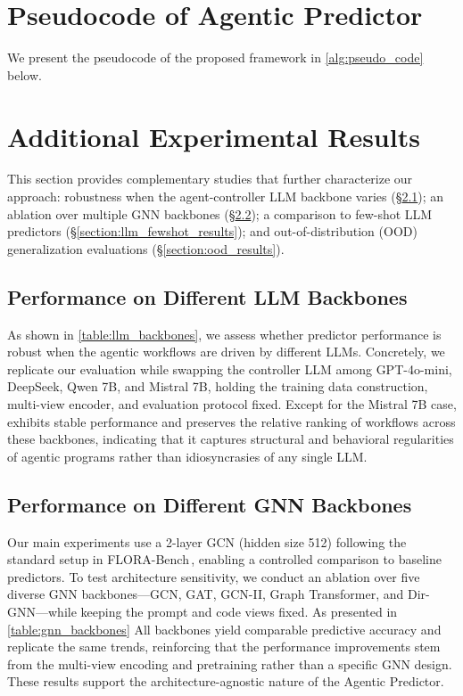 \newpage
\section{Pseudocode of Agentic Predictor} 
We present the pseudocode of the proposed \ours{} framework in \autoref{alg:pseudo_code} below.







\section{Additional Experimental Results} \label{section:extra_results}
This section provides complementary studies that further characterize our approach: robustness when the agent-controller LLM backbone varies (\S\ref{section:llm_backbone_results}); an ablation over multiple GNN backbones (\S\ref{section:gnn_backbone_reesults}); a comparison to few-shot LLM predictors (\S\ref{section:llm_fewshot_results}); and out-of-distribution (OOD) generalization evaluations (\S\ref{section:ood_results}).





\subsection{Performance on Different LLM Backbones} \label{section:llm_backbone_results}

As shown in \autoref{table:llm_backbones}, we assess whether predictor performance is robust when the agentic workflows are driven by different LLMs. Concretely, we replicate our evaluation while swapping the controller LLM among GPT-4o-mini, DeepSeek, Qwen 7B, and Mistral 7B, holding the training data construction, multi-view encoder, and evaluation protocol fixed. Except for the Mistral 7B case, \ours{} exhibits stable performance and preserves the relative ranking of workflows across these backbones, indicating that it captures structural and behavioral regularities of agentic programs rather than idiosyncrasies of any single LLM.

\subsection{Performance on Different GNN Backbones}  \label{section:gnn_backbone_reesults}
Our main experiments use a 2-layer GCN (hidden size 512) following the standard setup in FLORA-Bench\,\citep{FLORA_Bench_25}, enabling a controlled comparison to baseline predictors. To test architecture sensitivity, we conduct an ablation over five diverse GNN backbones---GCN, GAT, GCN-II, Graph Transformer, and Dir-GNN---while keeping the prompt and code views fixed. As presented in \autoref{table:gnn_backbones} All backbones yield comparable predictive accuracy and replicate the same trends, reinforcing that the performance improvements stem from the multi-view encoding and pretraining rather than a specific GNN design. These results support the architecture-agnostic nature of the Agentic Predictor.

